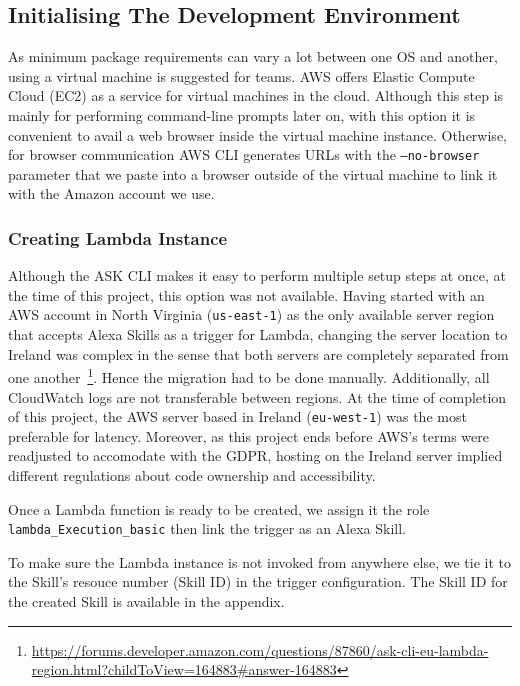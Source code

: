 \subsection*{Initialising The Development Environment}

As minimum package requirements can vary a lot between one OS and another, using a virtual machine is suggested for teams. AWS offers Elastic Compute Cloud (EC2) as a service for virtual machines in the cloud. Although this step is mainly for performing command-line prompts later on, %
with this option it is convenient to avail a web browser inside the virtual machine instance. Otherwise, for browser communication %
AWS CLI generates URLs with the \texttt{--no-browser} parameter that we %
paste into a browser outside of the virtual machine to link it with the Amazon account we use.


\subsubsection*{Creating Lambda Instance}

Although the ASK CLI makes it easy to perform multiple setup steps at once, at the time of this project, this option was not available. Having started with an AWS account in North Virginia (\texttt{us-east-1}) as the only available server region that accepts Alexa Skills as a trigger for Lambda, changing the server location to Ireland was complex in the sense that both servers are completely separated from one another~\footnote{
\url{https://forums.developer.amazon.com/questions/87860/ask-cli-eu-lambda-region.html?childToView=164883\#answer-164883}}.
Hence the migration had to be done manually. Additionally, all CloudWatch logs are not transferable between regions. At the time of completion of this project, the AWS server based in Ireland (\texttt{eu-west-1}) %
was the most preferable for latency. Moreover, as this project ends before AWS's terms were readjusted to accomodate with the GDPR, hosting on the Ireland server implied different regulations about code ownership and accessibility.

Once a Lambda function is ready to be created, we assign it the role \texttt{lambda_Execution_basic} then link the trigger as an Alexa Skill.

To make sure the Lambda instance is not invoked from anywhere else, we tie it to the Skill's resouce number (Skill ID) in the trigger configuration. The Skill ID for the created Skill is available in the appendix.

